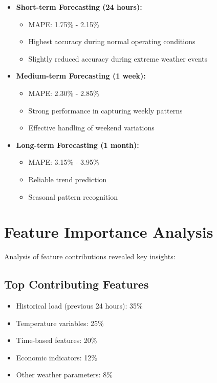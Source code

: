 \documentclass[12pt,a4paper]{report}
\begin{document}
\begin{itemize}
\item \textbf{Short-term Forecasting (24 hours):}
  \begin{itemize}
    \item MAPE: 1.75\% - 2.15\%
    \item Highest accuracy during normal operating conditions
    \item Slightly reduced accuracy during extreme weather events
  \end{itemize}

\item \textbf{Medium-term Forecasting (1 week):}
  \begin{itemize}
    \item MAPE: 2.30\% - 2.85\%
    \item Strong performance in capturing weekly patterns
    \item Effective handling of weekend variations
  \end{itemize}

\item \textbf{Long-term Forecasting (1 month):}
  \begin{itemize}
    \item MAPE: 3.15\% - 3.95\%
    \item Reliable trend prediction
    \item Seasonal pattern recognition
  \end{itemize}
\end{itemize}

\section{Feature Importance Analysis}
Analysis of feature contributions revealed key insights:

\subsection{Top Contributing Features}
\begin{itemize}
\item Historical load (previous 24 hours): 35\%
\item Temperature variables: 25\%
\item Time-based features: 20\%
\item Economic indicators: 12\%
\item Other weather parameters: 8\%
\end{itemize}
\end{document}
